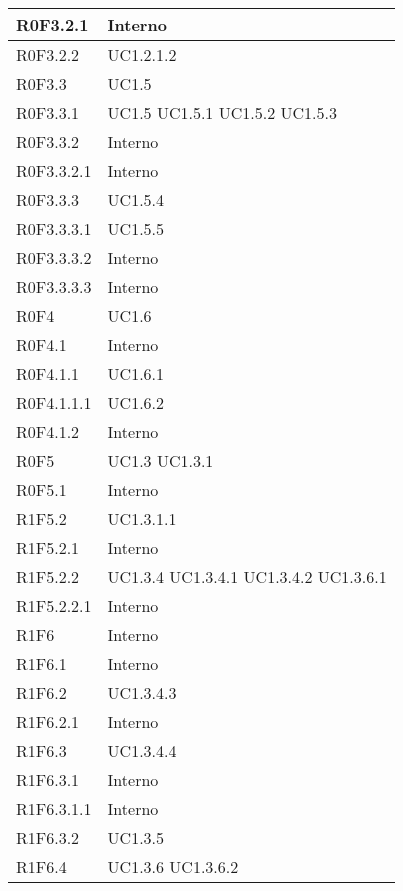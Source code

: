 \begin{center}
\begin{longtable}{| p{4cm} | p{4cm} |}
		\hline
		R0F3.2.1  &  Interno \\
		\hline
		R0F3.2.2  &  UC1.2.1.2 \\
		\hline
		R0F3.3  &  UC1.5 \\
		\hline
		R0F3.3.1  &  UC1.5 \newline UC1.5.1 \newline UC1.5.2 \newline UC1.5.3 \\
		\hline
		R0F3.3.2  &  Interno \\
		\hline
		R0F3.3.2.1  &  Interno \\
		\hline
		R0F3.3.3  &  UC1.5.4 \\
		\hline
		R0F3.3.3.1  &  UC1.5.5 \\
		\hline
		R0F3.3.3.2  &  Interno \\
		\hline
		R0F3.3.3.3  &  Interno \\
		\hline
		R0F4  &  UC1.6 \\
		\hline
		R0F4.1  &  Interno \\
		\hline
		R0F4.1.1  &  UC1.6.1 \\
		\hline
		R0F4.1.1.1  &  UC1.6.2 \\
		\hline
		R0F4.1.2  &  Interno \\
		\hline
		R0F5  &  UC1.3 \newline UC1.3.1 \\
		\hline
		R0F5.1  &  Interno \\
		\hline
		R1F5.2  &  UC1.3.1.1 \\
		\hline
		R1F5.2.1  &  Interno \\
		\hline
		R1F5.2.2  &  UC1.3.4 \newline UC1.3.4.1 \newline UC1.3.4.2 \newline UC1.3.6.1 \\
		\hline
		R1F5.2.2.1  &  Interno \\
		\hline
		R1F6  &  Interno \\
		\hline
		R1F6.1  &  Interno \\
		\hline
		R1F6.2  &  UC1.3.4.3 \\
		\hline
		R1F6.2.1  &  Interno \\
		\hline
		R1F6.3  &  UC1.3.4.4 \\
		\hline
		R1F6.3.1  &  Interno \\
		\hline
		R1F6.3.1.1  &  Interno \\
		\hline
		R1F6.3.2  &  UC1.3.5 \\
		\hline
		R1F6.4  &  UC1.3.6 \newline UC1.3.6.2 \\

\end{longtable}
\end{center}
